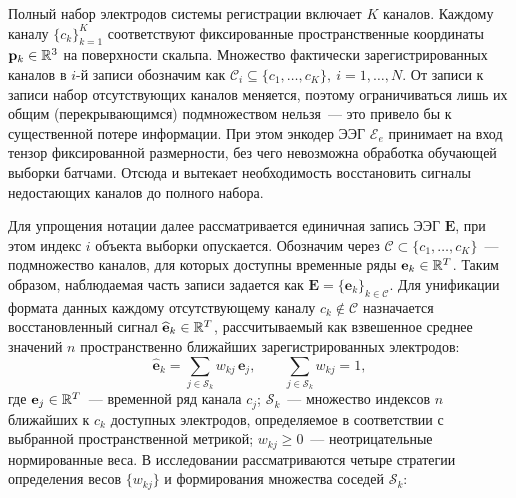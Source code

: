 Полный набор электродов системы регистрации включает $K$ каналов. Каждому каналу $\{c_k\}_{k=1}^K$ соответствуют фиксированные пространственные координаты $\mathbf{p}_k \in \mathbb{R}^3$ на поверхности скальпа. Множество фактически зарегистрированных каналов в $i$-й записи обозначим как $\mathcal{C}_i \subseteq \{c_1, \ldots, c_K\},~ i=1,\ldots, N$. От записи к записи набор отсутствующих каналов меняется, поэтому ограничиваться лишь их общим (перекрывающимся) подмножеством нельзя~--- это привело бы к существенной потере информации. При этом энкодер ЭЭГ $\mathcal{E}_e$ принимает на вход тензор фиксированной размерности, без чего невозможна обработка обучающей выборки батчами. Отсюда и вытекает необходимость восстановить сигналы недостающих каналов до полного набора.

Для упрощения нотации далее рассматривается единичная запись ЭЭГ $\mathbf{E}$, при этом индекс $i$ объекта выборки опускается. Обозначим через $\mathcal{C} \subset \{c_1, \dots, c_K\}$~--- подмножество каналов, для которых доступны временные ряды $\mathbf{e}_k \in \mathbb{R}^T$. Таким образом, наблюдаемая часть записи задается как $\mathbf{E} = \{\mathbf{e}_k\}_{k \in \mathcal{C}}$.
Для унификации формата данных каждому отсутствующему каналу $c_k \notin \mathcal{C}$ назначается восстановленный сигнал $\widehat{\mathbf{e}}_k \in \mathbb{R}^T$, рассчитываемый как взвешенное среднее значений $n$ пространственно ближайших зарегистрированных электродов:
\begin{equation}\label{eq:recover}
\widehat{\mathbf{e}}_k = \sum_{j \in \mathcal{S}_k} w_{kj}\, \mathbf{e}_j, \qquad \sum_{j \in \mathcal{S}_k} w_{kj} = 1,
\end{equation}
где $\mathbf{e}_j \in \mathbb{R}^T$~--- временной ряд канала $c_j$; $\mathcal{S}_k$~--- множество индексов $n$ ближайших к $c_k$ доступных электродов, определяемое в соответствии с выбранной пространственной метрикой; $w_{kj} \geq 0$~--- неотрицательные нормированные веса.
В исследовании рассматриваются четыре стратегии определения весов $\{w_{kj}\}$ и формирования множества соседей $\mathcal{S}_k$:
